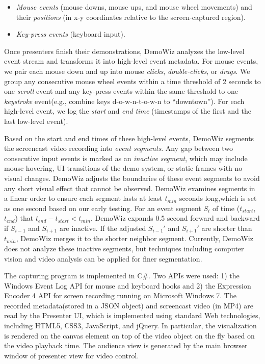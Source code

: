 \begin{itemize}
  \item \textit{Mouse events} (mouse downs, mouse ups, and mouse wheel movements) and their \textit{positions} (in x-y coordinates relative to the screen-captured region).
  \item \textit{Key-press events} (keyboard input).
\end{itemize}

Once presenters finish their demonstrations, DemoWiz analyzes the low-level event stream and transforms it into high-level event metadata. For mouse events, we pair each mouse down and up into mouse \textit{clicks}, \textit{double-clicks}, or \textit{drags}. We group any consecutive mouse wheel events within a time threshold of 2 seconds to one \textit{scroll} event and any key-press events within the same threshold to one \textit{keystroke} event(e.g., combine keys d-o-w-n-t-o-w-n to ``downtown''). For each high-level event, we log the \textit{start} and \textit{end time} (timestamps of the first and the last low-level event).

Based on the start and end times of these high-level events, DemoWiz segments the screencast video recording into \textit{event segments}. Any gap between two consecutive input events is marked as an \textit{inactive segment}, which may include mouse hovering, UI transitions of the demo system, or static frames with no visual changes. DemoWiz adjusts the boundaries of these event segments to avoid any short visual effect that cannot be observed. DemoWiz examines segments in a linear order to ensure each segment lasts at least $t_{min}$ seconds long,which is set as one second based on our early testing. For an event segment $S_i$ of time ($t_{start}$, $t_{end}$) that $t_{end} - t_{start} < t_{min}$, DemoWiz expands 0.5 second forward and backward if $S_{i-1}$ and $S_{i+1}$ are inactive. If the adjusted $S_{i-1}'$ and $S_{i+1}'$ are shorter than $t_{min}$, DemoWiz merges it to the shorter neighbor segment. Currently, DemoWiz does not analyze these inactive segments, but techniques including computer vision and video analysis \cite{Banovic:2012kd,Chi:2012:MAG:2380116.2380130} can be applied for finer segmentation.

The capturing program is implemented in C\#. Two APIs were used: 1) the Windows Event Log API for mouse and keyboard hooks and 2) the Expression Encoder 4 API for screen recording running on Microsoft Windows 7. The recorded metadata(stored in a JSON object) and screencast video (in MP4) are read by the Presenter UI, which is implemented using standard Web technologies, including HTML5, CSS3, JavaScript, and jQuery. In particular, the visualization is rendered on the canvas element on top of the video object on the fly based on the video playback time. The audience view is generated by the main browser window of presenter view for video control.
